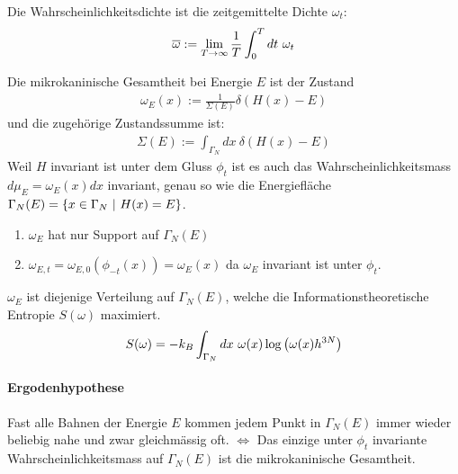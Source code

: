 \begin{definition}[Wahrscheinlichkeitsdichte]
    Die Wahrscheinlichkeitsdichte ist die zeitgemittelte Dichte $\omega_t$:
    \begin{align*}
        \overline{\omega} := \lim\limits_{T \rightarrow \infty} \frac{1}{T} \int_0^T dt \ \omega_t
    \end{align*}
\end{definition}

\begin{definition}
    Die mikrokaninische Gesamtheit bei Energie $E$ ist der Zustand
    \begin{align*}
        \omega_E(x) := \frac{1}{\Sigma (E)} \delta(H(x)-E)
    \end{align*}
    und die zugehörige Zustandssumme ist:
    \begin{align*}
        \Sigma(E) := \int_{\Gamma_N} dx \ \delta(H(x)-E)
    \end{align*}
    Weil $H$ invariant ist unter dem Gluss $\phi_t$ ist es auch das Wahrscheinlichkeitsmass
    $d \mu_E = \omega_E (x) dx$ invariant, genau so wie die Energiefläche
    $\Gamma_N (E) = \left\{ x \in \Gamma_N \ | \ H(x) = E \right\}$.
\end{definition}

\begin{bemerkung}
    \begin{enumerate}[1)]
        \item $\omega_E$ hat nur Support auf $\Gamma_N (E)$
        \item $\omega_{E,t} = \omega_{E,0} (\phi_{-t}(x)) = \omega_E (x)$
            da $\omega_E$ invariant ist unter $\phi_t$.
    \end{enumerate}
\end{bemerkung}

\begin{bemerkung}
    $\omega_E$ ist diejenige Verteilung auf $\Gamma_N (E)$, welche die
    Informationstheoretische Entropie $S(\omega)$ maximiert.
    \begin{align*}
        S(\omega) = - k_B \int_{\Gamma_N} dx \ \omega(x) \log \left( \omega(x) h^{3N} \right)
    \end{align*}
\end{bemerkung}

\paragraph{Ergodenhypothese}
Fast alle Bahnen der Energie $E$ kommen jedem Punkt in $\Gamma_N (E)$ immer
wieder beliebig nahe und zwar gleichmässig oft. $\Leftrightarrow$ Das einzige
unter $\phi_t$ invariante Wahrscheinlichkeitsmass auf $\Gamma_N (E)$ ist
die mikrokaninische Gesamtheit.

